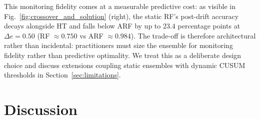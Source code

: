 \documentclass[smallextended]{svjour3}
\begin{document}
This monitoring fidelity comes at a measurable predictive cost: as visible in Fig.~\ref{fig:crossover_and_solution} (right), the static RF's post-drift accuracy decays alongside HT and falls below ARF by up to $23.4$ percentage points at $\Delta e = 0.50$ (RF $\approx 0.750$ vs ARF $\approx 0.984$). The trade-off is therefore architectural rather than incidental: practitioners must size the ensemble for monitoring fidelity rather than predictive optimality. We treat this as a deliberate design choice and discuss extensions coupling static ensembles with dynamic CUSUM thresholds in Section~\ref{sec:limitations}.

\section{Discussion}\label{sec:discussion}
\end{document}
